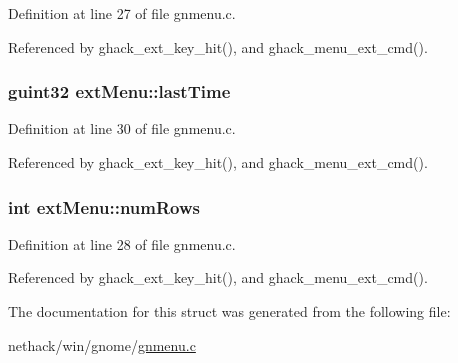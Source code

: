 Definition at line 27 of file gnmenu.\+c.



Referenced by ghack\+\_\+ext\+\_\+key\+\_\+hit(), and ghack\+\_\+menu\+\_\+ext\+\_\+cmd().

\hypertarget{structextMenu_a66b8a9fd7a18cf439b0a82d0712d540c}{
\subsubsection[{last\+Time}]{\setlength{\rightskip}{0pt plus 5cm}guint32 ext\+Menu\+::last\+Time}}\label{structextMenu_a66b8a9fd7a18cf439b0a82d0712d540c}


Definition at line 30 of file gnmenu.\+c.



Referenced by ghack\+\_\+ext\+\_\+key\+\_\+hit(), and ghack\+\_\+menu\+\_\+ext\+\_\+cmd().

\hypertarget{structextMenu_ac90ebf8746d53b094060b505a0c4dc4b}{
\subsubsection[{num\+Rows}]{\setlength{\rightskip}{0pt plus 5cm}int ext\+Menu\+::num\+Rows}}\label{structextMenu_ac90ebf8746d53b094060b505a0c4dc4b}


Definition at line 28 of file gnmenu.\+c.



Referenced by ghack\+\_\+ext\+\_\+key\+\_\+hit(), and ghack\+\_\+menu\+\_\+ext\+\_\+cmd().



The documentation for this struct was generated from the following file\+:\begin{DoxyCompactItemize}
\item 
nethack/win/gnome/\hyperlink{gnmenu_8c}{gnmenu.\+c}\end{DoxyCompactItemize}
